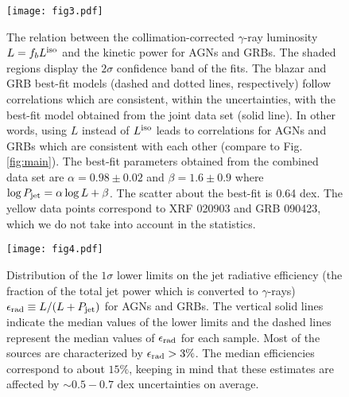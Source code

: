 \documentclass[12pt]{article}
\begin{document}
\begin{figure}[!t]
\centering
\texttt{[image: fig3.pdf]}	%
\caption{The relation between the collimation-corrected $\gamma$-ray luminosity $L=f_b L^{\rm iso}$ and the kinetic power for AGNs and GRBs. The shaded regions display the $2\sigma$ confidence band of the fits. 
%
The blazar and GRB best-fit models (dashed and dotted lines, respectively) follow correlations which are consistent, within the uncertainties, with the best-fit model obtained from the joint data set (solid line). In other words, using $L$ instead of $L^{\rm iso}$ leads to correlations for AGNs and GRBs which are consistent with each other (compare to Fig. \ref{fig:main}). The best-fit parameters obtained from the combined data set are $\alpha=0.98 \pm 0.02$ and $\beta=1.6 \pm 0.9$ where $\log P_{\rm jet} = \alpha \log L + \beta$. The scatter about the best-fit is 0.64 dex.  
%
The yellow data points correspond to XRF 020903 and GRB 090423, which we do not take into account in the statistics.}
\label{fig:debeam}
\end{figure}


\begin{figure}
\centering
\texttt{[image: fig4.pdf]}	%
\caption{Distribution of the $1\sigma$ lower limits on the jet radiative efficiency (the fraction of the total jet power which is converted to $\gamma$-rays) $\epsilon_{\rm rad} \equiv L/(L+P_{\rm jet})$ for AGNs and GRBs. The vertical solid lines indicate the median values of the lower limits and the dashed lines represent the median values of $\epsilon_{\rm rad}$ for each sample. Most of the sources are characterized by $\epsilon_{\rm rad} > 3\%$. The median efficiencies correspond to about $15\%$, keeping in mind that these estimates are affected by $\sim 0.5-0.7$ dex uncertainties on average. }
\label{fig:eff}
\end{figure}

\clearpage
\end{document}
